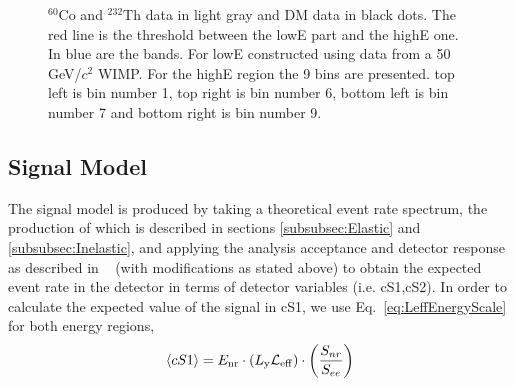 \begin{figure}[]
\begin{minipage}{1\linewidth}
\end{minipage}
\caption{$^{60}\mathrm{Co}$ and $^{232}\mathrm{Th}$ data in light gray and DM data in black dots. The red line is the threshold between the lowE part and the highE one. In blue are the bands. For lowE constructed using data from a 50 GeV/$c^2$ WIMP. For the highE region the 9 bins are presented. top left is bin number 1,  top right is bin number 6, bottom left is bin number 7 and bottom right is bin number 9.}
\label{fig:phasespace}
\end{figure}  




\subsection{Signal Model}
\label{subsec:SignalModel}
The signal model is produced by taking a theoretical event rate spectrum, the production of which is described in sections \ref{subsubsec:Elastic} and \ref{subsubsec:Inelastic}, and applying the analysis acceptance and detector response as described in ~\cite{xe100_ana2012} (with modifications as stated above) to obtain the expected event rate in the detector in terms of detector variables (i.e. cS1,cS2). In order to calculate the expected value of the signal in cS1, we use Eq.~\ref{eq:LeffEnergyScale} for both energy regions, 
\begin{equation}
\label{eq:LeffEnergyScale}
	\langle cS1 \rangle = E_{\mathrm{nr}} \cdot (L_{\mathrm{y}} \mathcal{L}_{\mathrm{eff}}) \cdot   \left(\frac{S_{nr}}{S_{ee}}\right) 
\end{equation}

%
%
%

